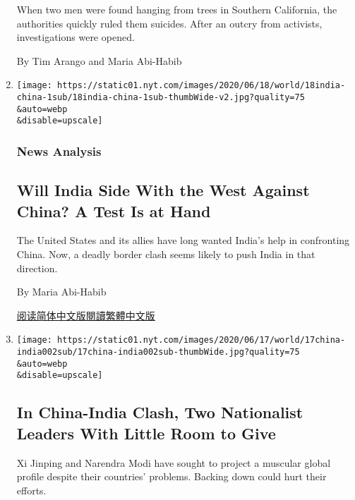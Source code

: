 \begin{enumerate}
  When two men were found hanging from trees in Southern California, the
  authorities quickly ruled them suicides. After an outcry from
  activists, investigations were opened.

  By Tim Arango and Maria Abi-Habib
\item
  \href{/2020/06/19/world/asia/india-china-border.html}{}

  \texttt{[image: https://static01.nyt.com/images/2020/06/18/world/18india-china-1sub/18india-china-1sub-thumbWide-v2.jpg?quality=75\\\&auto=webp\\\&disable=upscale]}

  \hypertarget{news-analysis}{%
  \subsubsection{News Analysis}\label{news-analysis}}

  \hypertarget{will-india-side-with-the-west-against-china-a-test-is-at-hand}{%
  \subsection{Will India Side With the West Against China? A Test Is at
  Hand}\label{will-india-side-with-the-west-against-china-a-test-is-at-hand}}

  The United States and its allies have long wanted India's help in
  confronting China. Now, a deadly border clash seems likely to push
  India in that direction.

  By Maria Abi-Habib

  \href{https://cn.nytimes.com/world/20200622/india-china-border/}{阅读简体中文版}\href{https://cn.nytimes.com/world/20200622/india-china-border/zh-hant/}{閱讀繁體中文版}
\item
  \href{/2020/06/17/world/asia/china-india-border.html}{}

  \texttt{[image: https://static01.nyt.com/images/2020/06/17/world/17china-india002sub/17china-india002sub-thumbWide.jpg?quality=75\\\&auto=webp\\\&disable=upscale]}

  \hypertarget{in-china-india-clash-two-nationalist-leaders-with-little-room-to-give}{%
  \subsection{In China-India Clash, Two Nationalist Leaders With Little
  Room to
  Give}\label{in-china-india-clash-two-nationalist-leaders-with-little-room-to-give}}

  Xi Jinping and Narendra Modi have sought to project a muscular global
  profile despite their countries' problems. Backing down could hurt
  their efforts.


\end{enumerate}
